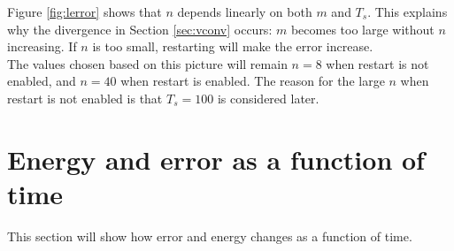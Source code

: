 Figure \ref{fig:lerror} shows that $n$ depends linearly on both $m$ and $T_s$. This explains why the divergence in Section \ref{sec:vconv} occurs: $m$ becomes too large without $n$ increasing. If $n$ is too small, restarting will make the error increase. \\

\noindent The values chosen based on this picture will remain $n = 8$ when restart is not enabled, and $n = 40$ when restart is enabled. The reason for the large $n$ when restart is not enabled is that $T_s = 100$ is considered later.

\section{Energy and error as a function of time } %
This section will show how error and energy changes as a function of time. 

